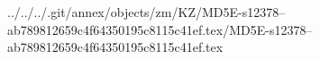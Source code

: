 ../../../.git/annex/objects/zm/KZ/MD5E-s12378--ab789812659c4f64350195c8115c41ef.tex/MD5E-s12378--ab789812659c4f64350195c8115c41ef.tex